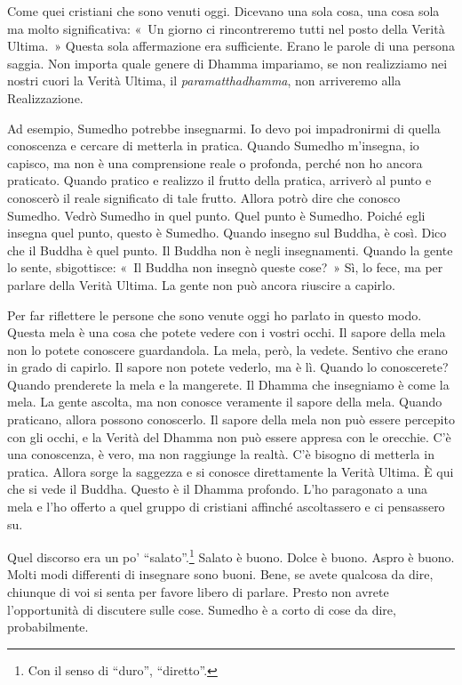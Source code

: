 Come quei cristiani che sono venuti oggi. Dicevano una sola cosa, una
cosa sola ma molto significativa: «~Un giorno ci rincontreremo tutti nel
posto della Verità Ultima.~» Questa sola affermazione era sufficiente.
Erano le parole di una persona saggia. Non importa quale genere di
Dhamma impariamo, se non realizziamo nei nostri cuori la Verità Ultima,
il \emph{paramatthadhamma}, non arriveremo alla Realizzazione.

Ad esempio, Sumedho potrebbe insegnarmi. Io devo poi impadronirmi di
quella conoscenza e cercare di metterla in pratica. Quando Sumedho
m'insegna, io capisco, ma non è una comprensione reale o profonda,
perché non ho ancora praticato. Quando pratico e realizzo il frutto
della pratica, arriverò al punto e conoscerò il reale significato di
tale frutto. Allora potrò dire che conosco Sumedho. Vedrò Sumedho in
quel punto. Quel punto è Sumedho. Poiché egli insegna quel punto, questo
è Sumedho. Quando insegno sul Buddha, è così. Dico che il Buddha è quel
punto. Il Buddha non è negli insegnamenti. Quando la gente lo sente,
sbigottisce: «~Il Buddha non insegnò queste cose?~» Sì, lo fece, ma per
parlare della Verità Ultima. La gente non può ancora riuscire a capirlo.

Per far riflettere le persone che sono venute oggi ho parlato in questo
modo. Questa mela è una cosa che potete vedere con i vostri occhi. Il
sapore della mela non lo potete conoscere guardandola. La mela, però, la
vedete. Sentivo che erano in grado di capirlo. Il sapore non potete
vederlo, ma è lì. Quando lo conoscerete? Quando prenderete la mela e la
mangerete. Il Dhamma che insegniamo è come la mela. La gente ascolta, ma
non conosce veramente il sapore della mela. Quando praticano, allora
possono conoscerlo. Il sapore della mela non può essere percepito con
gli occhi, e la Verità del Dhamma non può essere appresa con le
orecchie. C'è una conoscenza, è vero, ma non raggiunge la realtà. C'è
bisogno di metterla in pratica. Allora sorge la saggezza e si conosce
direttamente la Verità Ultima. È qui che si vede il Buddha. Questo è il
Dhamma profondo. L'ho paragonato a una mela e l'ho offerto a quel gruppo
di cristiani affinché ascoltassero e ci pensassero su.

Quel discorso era un po' ``salato''.\footnote{Con il senso di ``duro'',
  ``diretto''.} Salato è buono. Dolce è buono. Aspro è buono. Molti modi
differenti di insegnare sono buoni. Bene, se avete qualcosa da dire,
chiunque di voi si senta per favore libero di parlare. Presto non avrete
l'opportunità di discutere sulle cose. Sumedho è a corto di cose da
dire, probabilmente.

